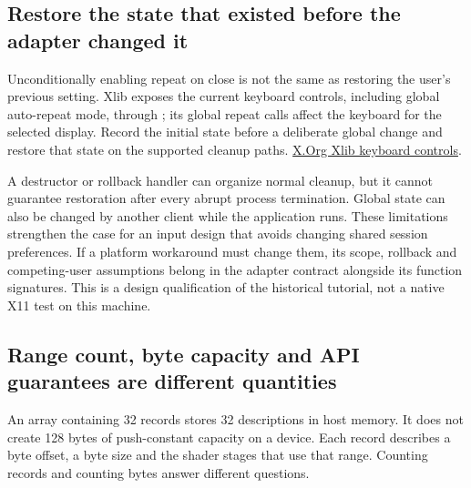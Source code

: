 \subsection{Restore the state that existed before the adapter changed it}\label{01-foundations-i-ch016-restore-the-state-that-existed-before-the-adapter-changed-it}

\hypertarget{01-foundations-i-ch016-restore-the-state-that-existed-before-the-adapter-changed-it}{}

Unconditionally enabling repeat on close is not the same as restoring the user's previous setting. Xlib exposes the current keyboard controls, including global auto-repeat mode, through ; its global repeat calls affect the keyboard for the selected display. Record the initial state before a deliberate global change and restore that state on the supported cleanup paths. \href{https://www.x.org/releases/X11R7.6/doc/libX11/specs/libX11/libX11.html}{X.Org Xlib keyboard controls}.

A destructor or rollback handler can organize normal cleanup, but it cannot guarantee restoration after every abrupt process termination. Global state can also be changed by another client while the application runs. These limitations strengthen the case for an input design that avoids changing shared session preferences. If a platform workaround must change them, its scope, rollback and competing-user assumptions belong in the adapter contract alongside its function signatures. This is a design qualification of the historical tutorial, not a native X11 test on this machine.

\subsection{Range count, byte capacity and API guarantees are different quantities}\label{01-foundations-i-ch016-range-count-byte-capacity-and-api-guarantees-are-different-quantities}

\hypertarget{01-foundations-i-ch016-range-count-byte-capacity-and-api-guarantees-are-different-quantities}{}

An array containing 32  records stores 32 descriptions in host memory. It does not create 128 bytes of push-constant capacity on a device. Each record describes a byte offset, a byte size and the shader stages that use that range. Counting records and counting bytes answer different questions.

